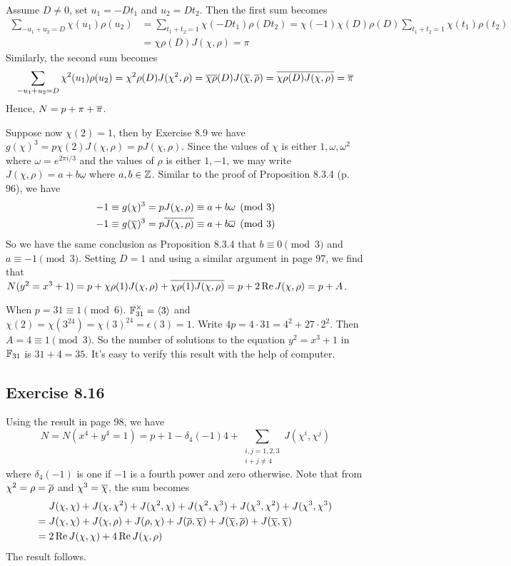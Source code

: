 \documentclass[../I&R.tex]{subfiles}
\begin{document}
Assume $D\neq0$, set $u_1=-Dt_1$ and $u_2=Dt_2$. Then the first sum becomes
\begin{align*}
    \sum_{-u_1+u_2=D} \chi(u_1)\rho(u_2) &= \sum_{t_1+t_2=1} \chi(-Dt_1)\rho(Dt_2) = \chi(-1)\chi(D)\rho(D)\sum_{t_1+t_2=1} \chi(t_1)\rho(t_2) \\
    &= \chi\rho(D)J(\chi,\rho) = \pi
\end{align*}
Similarly, the second sum becomes
\begin{align*}
    \sum_{-u_1+u_2=D} \chi^2(u_1)\rho(u_2) = \chi^2\rho(D)J(\chi^2,\rho) = \overline{\chi\rho}(D)J(\overline{\chi},\overline{\rho}) = \overline{\chi\rho(D)J(\chi,\rho)} = \overline{\pi}
\end{align*}
Hence, $N=p+\pi+\overline{\pi}$.

Suppose now $\chi(2)=1$, then by Exercise 8.9 we have $g(\chi)^3=p\chi(2)J(\chi,\rho)=pJ(\chi,\rho)$. Since the values of $\chi$ is either $1,\omega,\omega^2$ where $\omega=e^{2\pi i/3}$ and the values of $\rho$ is either $1,-1$, we may write $J(\chi,\rho)=a+b\omega$ where $a,b\in\mathbb{Z}$. Similar to the proof of Proposition 8.3.4 (p. 96), we have
\begin{align*}
    -1\equiv g(\chi)^3 = pJ(\chi,\rho) \equiv a+b\omega \pmod{3} \\
    -1\equiv g(\overline{\chi})^3 = p\overline{J(\chi,\rho)} \equiv a+b\overline{\omega} \pmod{3}
\end{align*}
So we have the same conclusion as Proposition 8.3.4 that $b\equiv0\pmod{3}$ and $a\equiv-1\pmod{3}$. Setting $D=1$ and using a similar argument in page 97, we find that $N(y^2=x^3+1)=p+\chi\rho(1)J(\chi,\rho)+\overline{\chi\rho(1)J(\chi,\rho)}=p+2\operatorname{Re} J(\chi,\rho)=p+A$.

When $p=31\equiv1\pmod{6}$. $\mathbb{F}_{31}^\times=\langle3\rangle$ and $\chi(2)=\chi(3^{24})=\chi(3)^{24}=\epsilon(3)=1$. Write $4p=4\cdot31=4^2+27\cdot2^2$. Then $A=4\equiv1\pmod{3}$. So the number of solutions to the equation $y^2=x^3+1$ in $\mathbb{F}_{31}$ is $31+4=35$. It's easy to verify this result with the help of computer.

\subsection*{Exercise 8.16}

Using the result in page 98, we have $$N=N(x^4+y^4=1)=p+1-\delta_4(-1)4+\sum_{\substack{i,j=1,2,3\\ i+j\neq4}} J(\chi^i,\chi^j)$$ where $\delta_4(-1)$ is one if $-1$ is a fourth power and zero otherwise. Note that from $\chi^2=\rho=\overline{\rho}$ and $\chi^3=\overline{\chi}$, the sum becomes 
\begin{align*}
    &J(\chi,\chi)+J(\chi,\chi^2)+J(\chi^2,\chi)+J(\chi^2,\chi^3)+J(\chi^3,\chi^2)+J(\chi^3,\chi^3) \\
    ={} &J(\chi,\chi)+J(\chi,\rho)+J(\rho,\chi)+J(\overline{\rho},\overline{\chi})+J(\overline{\chi},\overline{\rho})+J(\overline{\chi},\overline{\chi}) \\
    ={} &2\operatorname{Re} J(\chi,\chi)+4\operatorname{Re} J(\chi,\rho)
\end{align*}
The result follows.
\end{document}
